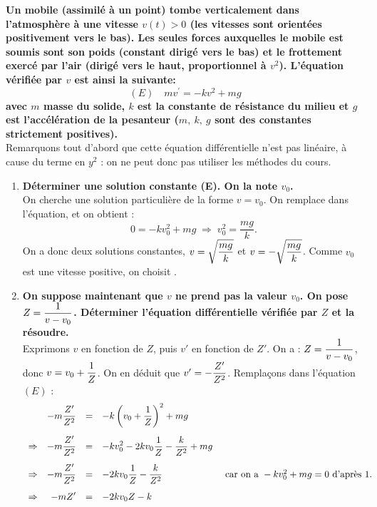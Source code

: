 \documentclass[a4paper, 11pt,reqno]{article}
\begin{document}
\begin{correction}  \;
\textbf{Un mobile (assimil\'e \`a un point) tombe verticalement dans l'atmosph\`ere \`a une vitesse $v(t)>0$ (les vitesses sont orient\'ees positivement vers le bas). Les seules forces auxquelles le mobile est soumis sont son poids (constant dirig\'e vers le bas) et le frottement exerc\'e par l'air (dirig\'e vers le haut, proportionnel \`a $v^2$). L'\'equation v\'erifi\'ee par $v$ est ainsi la suivante:}
$$(E)\quad mv^{\prime}=-kv^2+mg$$
\textbf{avec $m$ masse du solide, $k$ est la constante de r\'esistance du milieu et $g$ est l'acc\'el\'eration de la pesanteur ($m,\ k,\ g$ sont des constantes strictement positives).}\\
Remarquons tout d'abord que cette \'equation diff\'erentielle n'est pas lin\'eaire, \`a cause du terme en $y^2$ : on ne peut donc pas utiliser les m\'ethodes du cours.
\begin{enumerate}
\item \textbf{D\'eterminer une solution constante (E). On la note $v_0$.}\\
On cherche une solution particuli\`ere de la forme $v=v_0$. On remplace dans l'\'equation, et on obtient :
$$0=-kv_0^2+mg \; \Rightarrow \; v_0^2=\frac{mg}{k}.$$
On a donc deux solutions constantes, $v=\ddp \sqrt{\frac{mg}{k}}$ et $v=- \ddp \sqrt{\frac{mg}{k}}$. Comme $v_0$ est une vitesse positive, on choisit .
\item \textbf{On suppose maintenant que $v$ ne prend pas la valeur $v_0$. On pose $Z=\ddp\frac{1}{v-v_0}$. D\'eterminer l'\'equation diff\'erentielle v\'erifi\'ee par $Z$ et la r\'esoudre.}\\
Exprimons $v$ en fonction de $Z$, puis $v'$ en fonction de $Z'$. On a : $Z=\ddp\frac{1}{v-v_0}$, donc $v=v_0 + \ddp \frac{1}{Z}$. On en d\'eduit que $v' = -\ddp \frac{Z'}{Z^2}$. Rempla\c cons dans l'\'equation $(E)$ :
$$\begin{array}{crcll}
&- m \ddp \frac{Z'}{Z^2} & = & - k \left(v_0 + \ddp \frac{1}{Z}\right)^2 + mg \vsec\\
\Rightarrow & \ddp - m \ddp \frac{Z'}{Z^2} & = & \ddp- k v_0^2 - 2 k v_0  \frac{1}{Z} - \frac{k}{Z^2} + mg\vsec\\
\Rightarrow & \ddp - m \ddp \frac{Z'}{Z^2} & = & \ddp- 2 k v_0  \frac{1}{Z} - \frac{k}{Z^2} & \textmd{ car on a } -kv_0^2+mg =0 \textmd{ d'apr\`es 1. }\vsec\\
\Rightarrow & \ddp -m Z' &= & -2kv_0 Z - k\vsec\\

\end{array}$$
\end{enumerate}
\end{correction}
\end{document}
